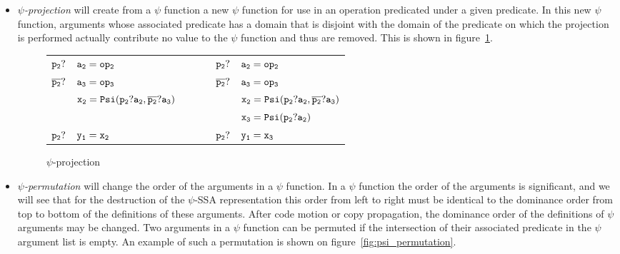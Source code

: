 \begin{itemize}
\item{\emph{$\psi$-projection}} will create from a $\psi$ function a
  new $\psi$ function for use in an operation predicated under a given
  predicate. In this new $\psi$ function, arguments whose associated
  predicate has a domain that is disjoint with the domain of the
  predicate on which the projection is performed actually contribute
  no value to the $\psi$ function and thus are removed. This is shown
  in figure~\ref{fig:psi_projection}.

\begin{figure}
\begin{center}
\footnotesize
\begin{tabular}{lllll}
${\tt p_2?}$ & ${\tt a_2 = op_2}$             & \ \ \ \  & ${\tt p_2?}$ & ${\tt a_2 = op_2}$ \\
${\tt \overline{p_2}?}$ & ${\tt a_3 = op_3}$              & \ \ \ \  & ${\tt \overline{p_2}?}$ & ${\tt a_3 = op_3}$ \\
             & ${\tt x_2 = Psi(p_2?a_2, \overline{p_2}?a_3)}$ & \ \ \ \  &              &${\tt x_2 = Psi(p_2?a_2, \overline{p_2}?a_3)}$ \\
             &                               & \ \ \ \  &              & ${\tt x_3 = Psi(p_2?a_2)}$ \\
${\tt p_2?}$ & ${\tt y_1 = x_2}$              & \ \ \ \  & ${\tt p_2?}$ & ${\tt y_1 = x_3}$ \\
\end{tabular}
\caption{$\psi$-projection}
\label{fig:psi_projection}
\end{center}
\end{figure}

\item{\emph{$\psi$-permutation}} will change the order of the
  arguments in a $\psi$ function. In a $\psi$ function the order of
  the arguments is significant, and we will see that for the
  destruction of the $\psi$-SSA representation this order from left to
  right must be identical to the dominance order from top to bottom of
  the definitions of these arguments. After code motion or copy
  propagation, the dominance order of the definitions of $\psi$
  arguments may be changed. Two arguments in a $\psi$ function can be
  permuted if the intersection of their associated predicate in the
  $\psi$ argument list is empty. An example of such a permutation is
  shown on figure~\ref{fig:psi_permutation}.


\end{itemize}
